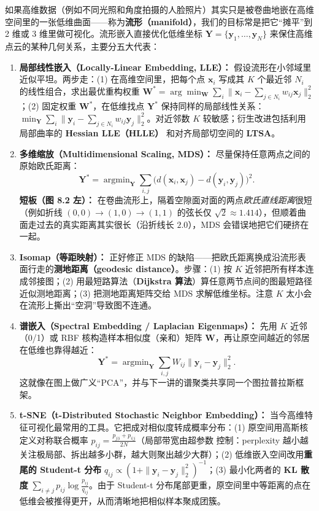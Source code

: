 如果高维数据（例如不同光照和角度拍摄的人脸照片）其实只是被卷曲地嵌在高维空间里的一张低维曲面——称为\textbf{流形（manifold）}，我们的目标常是把它“摊平”到 2 维或 3 维里做可视化。流形嵌入直接优化低维坐标 $\mathbf{Y}=\{\mathbf{y}_1,\dots,\mathbf{y}_N\}$ 来保住高维点云的某种几何关系，主要分五大代表：

\begin{enumerate}
\item \textbf{局部线性嵌入（Locally-Linear Embedding, LLE）：} 假设流形在小邻域里近似平坦。两步走：(1) 在高维空间里，把每个点 $\mathbf{x}_i$ 写成其 $K$ 个最近邻 $N_i$ 的线性组合，求出最优重构权重 $\mathbf{W}^* = \arg\min_{\mathbf{W}}\sum_i \|\mathbf{x}_i - \sum_{j\in N_i} w_{ij}\mathbf{x}_j\|_2^2$；(2) 固定权重 $\mathbf{W}^*$，在低维找点 $\mathbf{Y}^*$ 保持同样的局部线性关系：$\min_{\mathbf{Y}}\sum_i \|\mathbf{y}_i - \sum_{j\in N_i} w_{ij}\mathbf{y}_j\|_2^2$。对近邻数 $K$ 较敏感；衍生改进包括利用局部曲率的 \textbf{Hessian LLE（HLLE）} 和对齐局部切空间的 \textbf{LTSA}。
\item \textbf{多维缩放（Multidimensional Scaling, MDS）：} 尽量保持任意两点之间的原始欧氏距离：
\[
\mathbf{Y}^* = \mathop{\mathrm{argmin}}_{\mathbf{Y}}\sum_{i,j}\bigl(d(\mathbf{x}_i,\mathbf{x}_j) - d(\mathbf{y}_i,\mathbf{y}_j)\bigr)^2.
\tag{8.7}
\]
\textbf{短板（图 8.2 左）：} 在卷曲流形上，隔着空隙面对面的两点\emph{欧氏直线距离}很短（例如折线 $(0,0)\to(1,0)\to(1,1)$ 的弦长仅 $\sqrt{2}\approx 1.414$），但顺着曲面走过去的真实距离其实很长（沿折线长 $2.0$），MDS 会错误地把它们硬挤在一起。
\item \textbf{Isomap（等距映射）：} 正好修正 MDS 的缺陷——把欧氏距离换成沿流形表面行走的\textbf{测地距离（geodesic distance）}。步骤：(1) 按 $K$ 近邻把所有样本连成邻接图；(2) 用最短路算法（\textbf{Dijkstra 算法}）算任意两节点间的图最短路径近似测地距离；(3) 把测地距离矩阵交给 MDS 求解低维坐标。注意 $K$ 太小会在流形上撕出“空洞”导致图不连通。
\item \textbf{谱嵌入（Spectral Embedding / Laplacian Eigenmaps）：} 先用 $K$ 近邻（0/1）或 RBF 核构造样本相似度（亲和）矩阵 $\mathbf{W}$，再让原空间越近的邻居在低维也靠得越近：
\[
\mathbf{Y}^* = \mathop{\mathrm{argmin}}_{\mathbf{Y}}\sum_{i,j} W_{ij}\|\mathbf{y}_i - \mathbf{y}_j\|_2^2.
\tag{8.8}
\]
这就像在图上做广义“PCA”，并与下一讲的谱聚类共享同一个图拉普拉斯框架。
\item \textbf{t-SNE（t-Distributed Stochastic Neighbor Embedding）：} 当今高维特征可视化最常用的工具。它把成对相似度转成概率分布：(1) 原空间用高斯核定义对称联合概率 $p_{ij}=\frac{p_{j|i}+p_{i|j}}{2N}$（局部带宽由超参数  控制：perplexity 越小越关注极局部、拆出越多小群，越大则聚出越少大群）；(2) 低维嵌入空间改用\textbf{重尾的 Student-t 分布} $q_{ij}\propto (1+\|\mathbf{y}_i-\mathbf{y}_j\|_2^2)^{-1}$；(3) 最小化两者的 \textbf{KL 散度} $\sum_{i\ne j} p_{ij}\log\frac{p_{ij}}{q_{ij}}$。由于 Student-t 分布尾部更重，原空间里中等距离的点在低维会被推得更开，从而清晰地把相似样本聚成团簇。
\end{enumerate}

